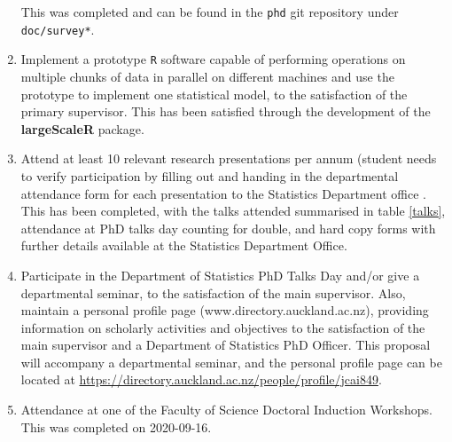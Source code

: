 \begin{enumerate}
                This was completed and can be found in the \texttt{phd} git repository under \texttt{doc/survey*}.
	\item Implement a prototype \texttt{R} software capable of performing operations on multiple chunks of data in parallel on different machines and use the prototype to implement one statistical model, to the satisfaction of the primary supervisor.
                This has been satisfied through the development of the \textbf{largeScaleR} package.
        \item Attend at least 10 relevant research presentations per annum (student needs to verify participation by filling out and handing in the departmental attendance form for each presentation to the Statistics Department office    .
                This has been completed, with the talks attended summarised in table \ref{talks}, attendance at PhD talks day counting for double, and hard copy forms with further details available at the Statistics Department Office.
        \item Participate in the Department of Statistics PhD Talks Day and/or give a departmental seminar, to the satisfaction of the main supervisor.
                Also, maintain a personal profile page (www.directory.auckland.ac.nz), providing information on scholarly activities and objectives to the satisfaction of the main supervisor and a Department of Statistics PhD Officer.
                This proposal will accompany a departmental seminar, and the personal profile page can be located at \url{https://directory.auckland.ac.nz/people/profile/jcai849}.
        \item Attendance at one of the Faculty of Science Doctoral Induction Workshops.
                This was completed  on 2020-09-16.
\end{enumerate}

